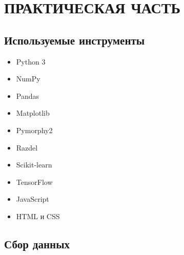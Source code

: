 \section{ПРАКТИЧЕСКАЯ ЧАСТЬ}


\subsection{Используемые инструменты}

\begin{itemize}
 \item Python 3


 \item NumPy


 \item Pandas


 \item Matplotlib


 \item Pymorphy2


 \item Razdel


 \item Scikit-learn


 \item TensorFlow


 \item JavaScript


 \item HTML и CSS
\end{itemize}


%


\subsection{Сбор данных}



